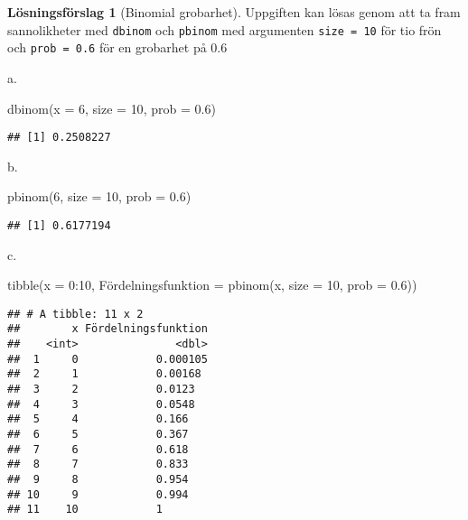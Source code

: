 \documentclass[
]{book}
\newenvironment{Shaded}{\begin{snugshade}}{\end{snugshade}}
\newcommand{\AttributeTok}[1]{\textcolor[rgb]{0.77,0.63,0.00}{#1}}
\newcommand{\DecValTok}[1]{\textcolor[rgb]{0.00,0.00,0.81}{#1}}
\newcommand{\FloatTok}[1]{\textcolor[rgb]{0.00,0.00,0.81}{#1}}
\newcommand{\FunctionTok}[1]{\textcolor[rgb]{0.00,0.00,0.00}{#1}}
\newcommand{\NormalTok}[1]{#1}
\newcommand{\OtherTok}[1]{\textcolor[rgb]{0.56,0.35,0.01}{#1}}
\newcommand{\SpecialCharTok}[1]{\textcolor[rgb]{0.00,0.00,0.00}{#1}}
\theoremstyle{definition}
\theoremstyle{definition}
\theoremstyle{definition}
\theoremstyle{definition}
\newtheorem{hypothesis}{Lösningsförslag}[chapter]
\theoremstyle{remark}
\begin{document}
\begin{hypothesis}[Binomial grobarhet]
Uppgiften kan lösas genom att ta fram sannolikheter med \texttt{dbinom} och \texttt{pbinom} med argumenten \texttt{size\ =\ 10} för tio frön och \texttt{prob\ =\ 0.6} för en grobarhet på 0.6

a.

\begin{Shaded}
\begin{Highlighting}[]
\FunctionTok{dbinom}\NormalTok{(}\AttributeTok{x =} \DecValTok{6}\NormalTok{, }\AttributeTok{size =} \DecValTok{10}\NormalTok{, }\AttributeTok{prob =} \FloatTok{0.6}\NormalTok{)}
\end{Highlighting}
\end{Shaded}

\begin{verbatim}
## [1] 0.2508227
\end{verbatim}

b.

\begin{Shaded}
\begin{Highlighting}[]
\FunctionTok{pbinom}\NormalTok{(}\DecValTok{6}\NormalTok{, }\AttributeTok{size =} \DecValTok{10}\NormalTok{, }\AttributeTok{prob =} \FloatTok{0.6}\NormalTok{)}
\end{Highlighting}
\end{Shaded}

\begin{verbatim}
## [1] 0.6177194
\end{verbatim}

c.

\begin{Shaded}
\begin{Highlighting}[]
\FunctionTok{tibble}\NormalTok{(}\AttributeTok{x =} \DecValTok{0}\SpecialCharTok{:}\DecValTok{10}\NormalTok{,}
\NormalTok{       Fördelningsfunktion }\OtherTok{=} \FunctionTok{pbinom}\NormalTok{(x, }\AttributeTok{size =} \DecValTok{10}\NormalTok{, }\AttributeTok{prob =} \FloatTok{0.6}\NormalTok{))}
\end{Highlighting}
\end{Shaded}

\begin{verbatim}
## # A tibble: 11 x 2
##        x Fördelningsfunktion
##    <int>               <dbl>
##  1     0            0.000105
##  2     1            0.00168 
##  3     2            0.0123  
##  4     3            0.0548  
##  5     4            0.166   
##  6     5            0.367   
##  7     6            0.618   
##  8     7            0.833   
##  9     8            0.954   
## 10     9            0.994   
## 11    10            1
\end{verbatim}


\end{hypothesis}
\end{document}
